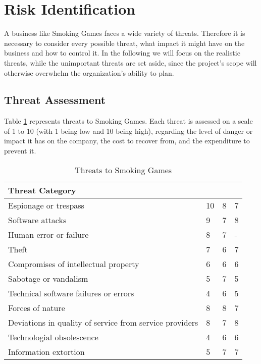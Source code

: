 \newpage
\section{Risk Identification}\label{RiskIdent}
A business like Smoking Games faces a wide variety of threats. Therefore it is necessary to consider every possible threat, what impact it might have on the business and how to control it. In the following we will focus on the realistic threats, while the unimportant threats are set aside, since the project's scope will otherwise overwhelm the organization's ability to plan.
\subsection{Threat Assessment}
Table \ref{tab:Threats1} represents threats to Smoking Games. Each threat is assessed on a scale of 1 to 10 (with 1 being low and 10 being high), regarding the level of danger or impact it has on the company, the cost to recover from, and the expenditure to prevent it.\\
\begin{table}[h]
	\centering
	\begin{tabular}{| l | l | l | l |}
		\hline
		\textbf{Threat Category} & \textbf{\parbox[t]{2cm}{Danger/\\Impact}} & \textbf{\parbox[t]{2cm}{Recovery\\Cost}} & \textbf{\parbox[t]{2cm}{Prevention\\Expenditure}}\\\hline
		Espionage or trespass & 10 & 8 & 7\\\hline
		Software attacks & 9 & 7 & 8\\\hline
		Human error or failure & 8 & 7 & -\\\hline
		Theft & 7 & 6 & 7\\\hline
		Compromises of intellectual property & 6 & 6 & 6\\\hline
		Sabotage or vandalism & 5 & 7 & 5\\\hline
		Technical software failures or errors & 4 & 6 & 5\\\hline
		Forces of nature & 8 & 8 & 7\\\hline
		\parbox[t]{5cm}{Deviations in quality of service from service providers} & 8 & 7 & 8\\\hline
		Technologial obsolescence & 4 & 6 & 6\\\hline
		Information extortion & 5 & 7 & 7\\\hline
	\end{tabular}
	\caption{Threats to Smoking Games}\label{tab:Threats1}
\end{table}